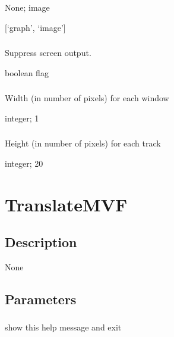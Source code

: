 \documentclass[letterpaper,11pt,english]{sphinxmanual}
\begin{document}
 None;  image

 {[}‘graph’, ‘image’{]}


\subsubsection{}
\label{\detokenize{prog_desc:id120}}
 Suppress screen output.

 boolean flag


\subsubsection{}
\label{\detokenize{prog_desc:xscale}}
 Width (in number of pixels) for each window

 integer;  1


\subsubsection{}
\label{\detokenize{prog_desc:yscale}}
 Height (in number of pixels) for each track

 integer;  20


\section{TranslateMVF}
\label{\detokenize{prog_desc:translatemvf}}

\subsection{Description}
\label{\detokenize{prog_desc:id121}}
None


\subsection{Parameters}
\label{\detokenize{prog_desc:id122}}

\subsubsection{}
\label{\detokenize{prog_desc:id123}}
 show this help message and exit
\end{document}
